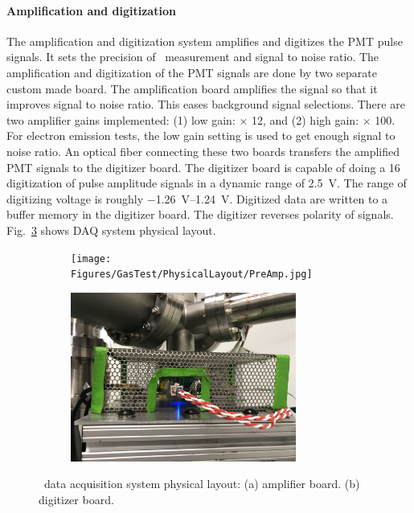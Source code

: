 \paragraph{Amplification and digitization} %
The amplification and digitization system amplifies and digitizes the PMT pulse signals. It sets the precision of  \sphe\ measurement and signal to noise ratio. The amplification and digitization of the PMT signals are done by two separate custom made board. The amplification board amplifies the signal so that it improves signal to noise ratio. This eases background signal selections. There are two amplifier gains implemented: (1) low gain: $\times$ 12, and (2) high gain: $\times$ 100. For electron emission tests, the low gain setting is used to get enough signal to noise ratio. 
An optical fiber connecting these two boards transfers the amplified PMT signals to the digitizer board. The digitizer board is capable of doing a \SI{16}{\bit} digitization of pulse amplitude signals in a dynamic range of \SI{2.5}{\V}. The range of digitizing voltage is roughly \SIrange{-1.26}{1.24}{\V}. Digitized data are written to a buffer memory in the digitizer board. %
The digitizer reverses polarity of signals. Fig.~\ref{fig:DAQPhysicalLayout} shows DAQ system physical layout.

\begin{figure}[!tb]
 \centering
 \begin{subfigure}[t]{\halfwidth}
    	    	\centering
   \texttt{[image: Figures/GasTest/PhysicalLayout/PreAmp.jpg]}
   \caption{}
   \label{fig:amplifier}
 \end{subfigure}
 \begin{subfigure}[t]{\halfwidth}
    	    	\centering
   \includegraphics[height=15em]{Figures/GasTest/PhysicalLayout/DigitizerInBox.jpg}
   \caption{}
   \label{fig:digitizer}
 \end{subfigure}
 \caption[\gtest\ data acquisition system physical layout]{\gtest\ data acquisition system physical layout: (a) amplifier board. (b) digitizer board.}
 \label{fig:DAQPhysicalLayout}
\end{figure}

